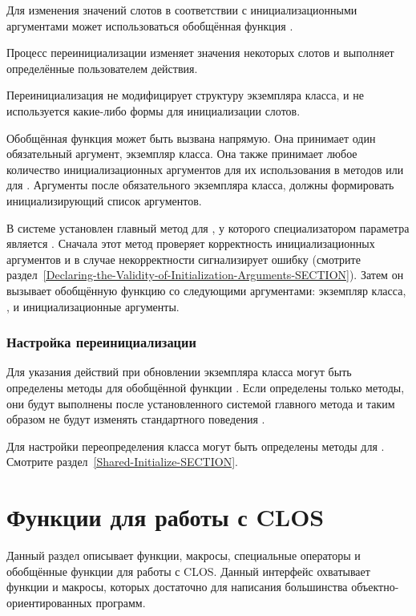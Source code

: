 Для изменения значений слотов в соответствии с инициализационными аргументами
может использоваться обобщённая функция .

Процесс переинициализации изменяет значения некоторых слотов и выполняет
определённые пользователем действия.

Переинициализация не модифицирует структуру экземпляра класса, и не используется
какие-либо формы  для инициализации слотов.

Обобщённая функция  может быть вызвана напрямую. Она
принимает один обязательный аргумент, экземпляр класса. Она также принимает
любое количество инициализационных аргументов для их использования в методов
 или для . Аргументы после
обязательного экземпляра класса, должны формировать инициализирующий список
аргументов.

В системе установлен главный метод для , у которого
специализатором параметра является . Сначала этот метод
проверяет корректность инициализационных аргументов и в случае некорректности
сигнализирует ошибку (смотрите
раздел~\ref{Declaring-the-Validity-of-Initialization-Arguments-SECTION}).
Затем он вызывает обобщённую функцию  со следующими
аргументами: экземпляр класса, , и инициализационные аргументы.

\subsubsection{Настройка переинициализации}

Для указания действий при обновлении экземпляра класса могут быть определены
методы для обобщённой функции . Если определены
только  методы, они будут выполнены после установленного системой
главного метода и таким образом не будут изменять стандартного поведения
.

Для настройки переопределения класса могут быть определены методы для
. Смотрите раздел~\ref{Shared-Initialize-SECTION}.

\section{Функции для работы с CLOS}
\label{Functions-in-the-Programmer-Interface-SECTION}

Данный раздел описывает функции, макросы, специальные операторы и обобщённые
функции для работы с CLOS. Данный интерфейс охватывает функции и макросы,
которых достаточно для написания большинства объектно-ориентированных программ.

